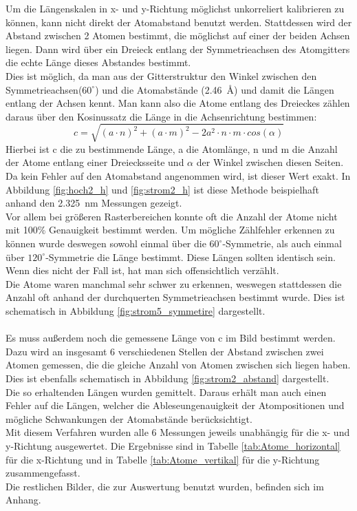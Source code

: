 \documentclass[12pt,a4paper]{article}
\begin{document}
Um die Längenskalen in x- und y-Richtung möglichst unkorreliert kalibrieren zu können, kann nicht direkt der Atomabstand benutzt werden. Stattdessen wird der Abstand zwischen 2 Atomen bestimmt, die möglichst auf einer der beiden Achsen liegen. Dann wird über ein Dreieck entlang der Symmetrieachsen des Atomgitters die echte Länge dieses Abstandes bestimmt.\\
Dies ist möglich, da man aus der Gitterstruktur den Winkel zwischen den Symmetrieachsen($60^{\circ}$) und die Atomabstände (\SI{2.46}{\angstrom}) und damit die Längen entlang der Achsen kennt. Man kann also die Atome entlang des Dreieckes zählen daraus über den Kosinussatz die Länge in die Achsenrichtung bestimmen:
\begin{equation}
c = \sqrt{(a\cdot n)^{2}+(a\cdot m)^2-2 a^{2}\cdot n\cdot m\cdot cos(\alpha)}
\end{equation}
Hierbei ist c die zu bestimmende Länge, a die Atomlänge, n und m die Anzahl der Atome entlang einer Dreiecksseite und $\alpha$ der Winkel zwischen diesen Seiten.\\Da kein Fehler auf den Atomabstand angenommen wird, ist dieser Wert exakt.
In Abbildung \ref{fig:hoch2_h} und \ref{fig:strom2_h} ist diese Methode beispielhaft anhand den \SI{2,325}{nm} Messungen gezeigt.\\
Vor allem bei größeren Rasterbereichen konnte oft die Anzahl der Atome nicht mit 100\% Genauigkeit bestimmt werden.
Um mögliche Zählfehler erkennen zu können wurde deswegen sowohl einmal über die  $60^{\circ}$-Symmetrie, als auch einmal über $120^{\circ}$-Symmetrie die Länge bestimmt. Diese Längen sollten identisch sein. Wenn dies nicht der Fall ist, hat man sich offensichtlich verzählt.\\
Die Atome waren manchmal sehr schwer zu erkennen, weswegen stattdessen die Anzahl oft anhand der durchquerten Symmetrieachsen bestimmt wurde. Dies ist schematisch in Abbildung \ref{fig:strom5_symmetire} dargestellt.\\
\\
Es muss außerdem noch die gemessene Länge von c im Bild bestimmt werden.\\
Dazu wird an insgesamt 6 verschiedenen Stellen der Abstand zwischen zwei Atomen gemessen, die die gleiche Anzahl von Atomen zwischen sich liegen haben.
Dies ist ebenfalls schematisch in Abbildung \ref{fig:strom2_abstand} dargestellt.\\
Die so erhaltenden Längen wurden gemittelt. Daraus erhält man auch einen Fehler auf die Längen, welcher die Ableseungenauigkeit der Atompositionen und mögliche Schwankungen der Atomabstände berücksichtigt.
\\
Mit diesem Verfahren wurden alle 6 Messungen jeweils unabhängig für die x- und y-Richtung ausgewertet. Die Ergebnisse sind in Tabelle \ref{tab:Atome_horizontal} für die x-Richtung und in Tabelle \ref{tab:Atome_vertikal} für die y-Richtung zusammengefasst.\\
Die restlichen Bilder, die zur Auswertung benutzt wurden, befinden sich im Anhang.\\
\end{document}
